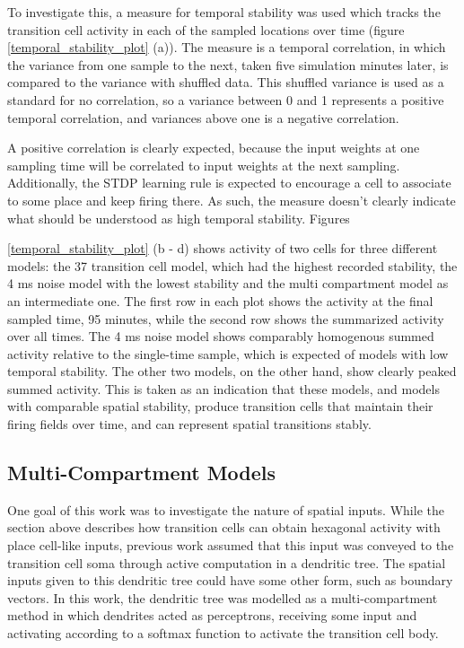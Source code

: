 \documentclass{article}
\begin{document}
    To investigate this, a measure for temporal stability was used which tracks the transition cell activity in each of the sampled locations over time (figure \ref{temporal_stability_plot} (a)). The measure is a temporal correlation, in which the variance from one sample to the next, taken five simulation minutes later, is compared to the variance with shuffled data. This shuffled variance is used as a standard for no correlation, so a variance between 0 and 1 represents a positive temporal correlation, and variances above one is a negative correlation.
    
    A positive correlation is clearly expected, because the input weights at one sampling time will be correlated to input weights at the next sampling. Additionally, the STDP learning rule is expected to encourage a cell to associate to some place and keep firing there. As such, the measure doesn't clearly indicate what should be understood as high temporal stability. Figures 
    
    \ref{temporal_stability_plot} (b - d) shows activity of two cells for three different models: the 37 transition cell model, which had the highest recorded stability, the 4 ms noise model with the lowest stability and the multi compartment model as an intermediate one. The first row in each plot shows the activity at the final sampled time, 95 minutes, while the second row shows the summarized activity over all times. The 4 ms noise model shows comparably homogenous summed activity relative to the single-time sample, which is expected of models with low temporal stability. The other two models, on the other hand, show clearly peaked summed activity. This is taken as an indication that these models, and models with comparable spatial stability, produce transition cells that maintain their firing fields over time, and can represent spatial transitions stably.


    \subsection{Multi-Compartment Models}
    One goal of this work was to investigate the nature of spatial inputs. While the section above describes how transition cells can obtain hexagonal activity with place cell-like inputs, previous work assumed that this input was conveyed to the transition cell soma through active computation in a dendritic tree. The spatial inputs given to this dendritic tree could have some other form, such as boundary vectors. In this work, the dendritic tree was modelled as a multi-compartment method in which dendrites acted as perceptrons, receiving some input and activating according to a softmax function to activate the transition cell body.
\end{document}
